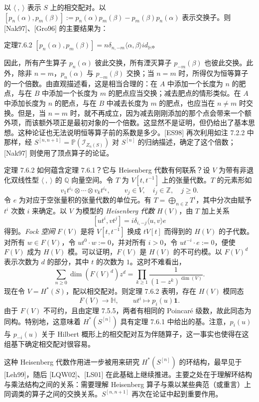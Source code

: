 以 $\langle\ ,\ \rangle$ 表示 $S$ 上的相交配对。以 $[p_n(\alpha),p_m(\beta)]:=p_n(\alpha)p_m(\beta)-p_m(\beta)p_n(\alpha)$ 表示交换子。则 [Nak97]、[Gro96] 的主要结果为：

\begin{origstatement}{定理}{7.6.2}\label{ch07:7.6.2}
$[p_n(\alpha),p_m(\beta)]=n\delta_{n,-m}\langle\alpha,\beta\rangle id_{\mathbb H}$。
\end{origstatement}
因此，所有产生算子 $p_n(\alpha)$ 彼此交换，所有湮灭算子 $p_{-m}(\beta)$ 也彼此交换。此外，除非 $n=m$，$p_n(\alpha)$ 与 $p_{-m}(\beta)$ 交换；当 $n=m$ 时，所得仅为恒等算子的一个倍数。由直观描述看，这是相当合理的：在 $A$ 中添加一个长度为 $n$ 的肥点，与在 $B$ 中添加一个长度为 $m$ 的肥点应当交换；减去肥点的情形类似。在 $A$ 中添加长度为 $n$ 的肥点，与在 $B$ 中减去长度为 $m$ 的肥点，也应当在 $n\ne m$ 时交换。但是，当 $n=m$ 时，就不再成立，因为减去刚刚添加的那个点会带来一个额外项，而该额外项正是最初对象的一个倍数。这显然不是证明，但仍给出了基本思想。这种论证也无法说明恒等算子前的系数是多少。[ES98] 再次利用如注 7.2.2 中那样，经 $S^{[n,n+1]}=\mathbb P(\mathcal I_{Z_n(S)})$ 对 $S^{[n]}$ 的归纳描述，确定了这个倍数；[Nak97] 则使用了顶点算子的论证。

定理 7.6.2 如何蕴含定理 7.6.1？它与 Heisenberg 代数有何联系？设 $V$ 为带有非退化双线性型 $\langle\ ,\ \rangle$ 的 $\mathbb Q$ 向量空间。令 $T$ 为 $V[t,t^{-1}]$ 上的张量代数。$T$ 的元素形如
\[
v_1t^{i_1}\otimes\cdots\otimes v_kt^{i_k},\qquad
v_j\in V,\quad i_j\in\mathbb Z,\quad j\geq0.
\]
令 $e$ 为对应于空张量积的张量代数的单位元。有 $T=\bigoplus_{n\in\mathbb Z}T^i$，其中分次由赋予 $t^i$ 次数 $i$ 来确定。以 $V$ 为模型的 \emph{Heisenberg 代数} $H(V)$，由 $T$ 加上关系
\[
[ut^i,vt^j]=i\delta_{i,-j}\langle u,v\rangle e
\]
得到。\emph{Fock 空间} $F(V)$ 是将 $V[t,t^{-1}]$ 换成 $tV[t]$ 而得到的 $H(V)$ 的子代数。对所有 $w\in F(V)$，令 $ut^0\cdot w:=0$，并对所有 $i>0$，令 $ut^{-i}\cdot e:=0$，便使 $F(V)$ 成为 $H(V)$ 模。可以证明，$F(V)$ 是 $H(V)$ 的不可约模。以 $F(V)^d$ 表示次数为 $d$ 的部分，其中 $t$ 的次数为 $1$。这时不难看出，
\[
\sum_{n\geq0}\dim(F(V)^d)z^d
=\prod_{k\geq1}\frac{1}{(1-z^k)^{\dim(V)}}.
\]
现在令 $V=H^*(S)$，配以相交配对。则定理 7.6.2 表明，存在 $H(V)$ 模同态
\[
F(V)\longrightarrow\mathbb H,\qquad ut^i\longmapsto p_i(u)\mathbf1.
\]
由于 $F(V)$ 不可约，且由定理 7.5.5，两者有相同的 Poincaré 级数，故此同态为同构。特别地，这意味着 $H^*(S^{[n]})$ 具有定理 7.6.1 中给出的基。注意，$p_i(u)$ 与 $p_{-i}(u)$ 关于 Hilbert 概形上的相交配对互为伴随算子，这一事实也使得在这组基下确定相交配对很容易。

这种 Heisenberg 代数作用进一步被用来研究 $H^*(S^{[n]})$ 的环结构，最早见于 [Leh99]，随后 [LQW02]、[LS01] 在此基础上继续推进。主要之处在于理解环结构与乘法结构之间的关系：需要理解 Heisenberg 算子与乘以某些典范（或重言）上同调类的算子之间的交换关系。$S^{[n,n+1]}$ 再次在论证中起到重要作用。
